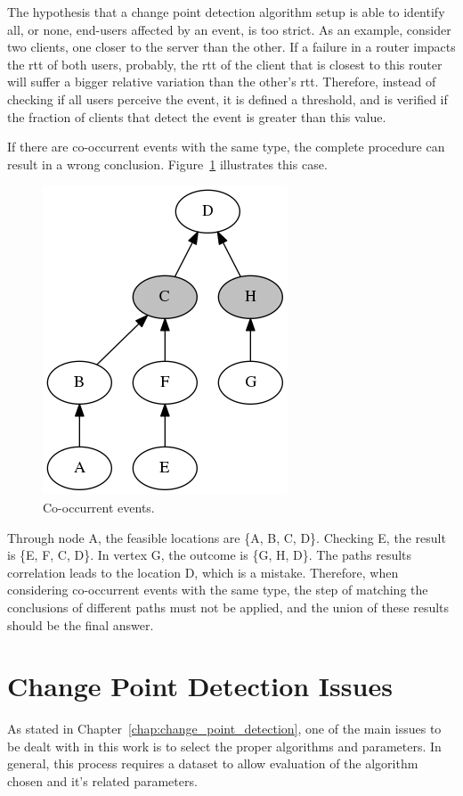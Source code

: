 The hypothesis that a change point detection algorithm setup is able to
identify all, or none, end-users affected by an event, is too strict.
As an example, consider two clients, one closer to the server than the
other.
If a failure in a router impacts the \gls*{rtt} of both users, probably,
the \gls*{rtt} of the client that is closest to this router
will suffer a bigger relative variation than the
other's \gls*{rtt}\@.
Therefore, instead of checking if all users perceive the event,
it is defined a threshold, and is verified if the fraction of clients
that detect the event is greater than this value.

If there are co-occurrent events with the same type, the complete procedure can
result in a wrong conclusion. Figure~\ref{fig:network_events_locations_examples_5}
illustrates this case.

\begin{figure}[H]
    \centering
    \includegraphics[width=0.35\linewidth]{./figures/methodology/spatial_time_correlation/event_tree_graph_5.png}
    \caption{Co-occurrent events.}
\label{fig:network_events_locations_examples_5}
\end{figure}%

Through node A, the feasible locations are \{A, B, C, D\}.
Checking E, the result is \{E, F, C, D\}.
In vertex G, the outcome is \{G, H, D\}.
The paths results correlation leads to the location D, which is a mistake.
Therefore, when considering co-occurrent events with the same type, the step of
matching the conclusions of different paths must not be applied, and the
union of these results should be the final answer.

\section{Change Point Detection Issues}

As stated in Chapter~\ref{chap:change_point_detection}, one of the main issues
to be dealt with in
this work is to select the proper algorithms and parameters.
In general, this process requires a dataset to allow evaluation of the
algorithm chosen and it's related parameters.

